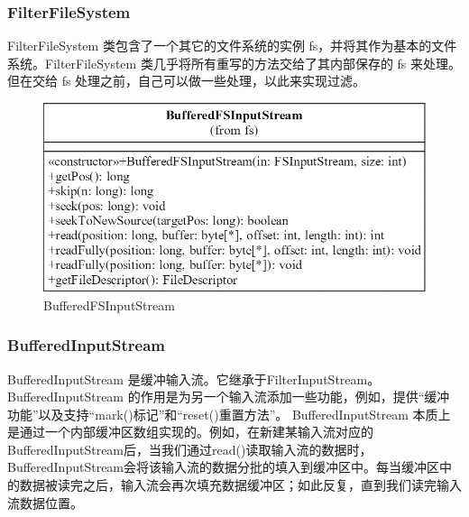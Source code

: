 	\subsubsection{FilterFileSystem} 
	FilterFileSystem 类包含了一个其它的文件系统的实例 fs，并将其作为基本的文件系统。FilterFileSystem 类几乎将所有重写的方法交给了其内部保存的 fs 来处理。但在交给 fs 处理之前，自己可以做一些处理，以此来实现过滤。
	\begin{figure}
		\centering
		\includegraphics[width=0.7\linewidth]{UML/inputstream/BufferedFSInputStream.png}
		\caption{BufferedFSInputStream}
		\label{fig:graph8}
	\end{figure}
	
	\subsubsection{BufferedInputStream} 
	BufferedInputStream 是缓冲输入流。它继承于FilterInputStream。
	BufferedInputStream 的作用是为另一个输入流添加一些功能，例如，提供“缓冲功能”以及支持“mark()标记”和“reset()重置方法”。
	BufferedInputStream 本质上是通过一个内部缓冲区数组实现的。例如，在新建某输入流对应的BufferedInputStream后，当我们通过read()读取输入流的数据时，BufferedInputStream会将该输入流的数据分批的填入到缓冲区中。每当缓冲区中的数据被读完之后，输入流会再次填充数据缓冲区；如此反复，直到我们读完输入流数据位置。
	
	\endinput